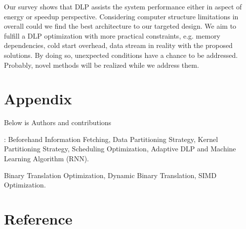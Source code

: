 \documentclass[sigconf, nonacm, natbib=false]{acmart}
\begin{document}
Our survey shows that DLP assists the system performance either in aspect of energy or speedup perspective. Considering computer structure limitations in overall could we find the best architecture to our targeted design. We aim to fulfill a DLP optimization with more practical constraints, e.g. memory dependencies, cold start overhead, data stream in reality with the proposed solutions. By doing so, unexpected conditions have a chance to be addressed.
Probably, novel methods will be realized while we address them. 

\section{Appendix}
\noindent Below is Authors and contributions

: Beforehand Information Fetching, Data Partitioning Strategy, Kernel Partitioning Strategy, Scheduling Optimization, Adaptive DLP and Machine Learning Algorithm (RNN).

 Binary Translation Optimization, Dynamic Binary Translation, SIMD Optimization.

\section{Reference}
\printbibliography[heading=none]
\end{document}

